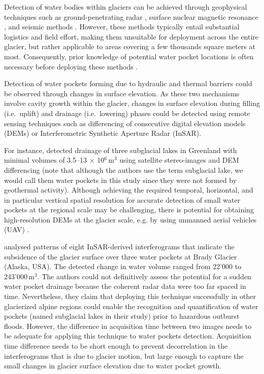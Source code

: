 Detection of water bodies within glaciers can be achieved through geophysical techniques such as ground-penetrating radar \citep[e.g.][]{Vincent&al2012,Church&al2021}, surface nuclear magnetic resonance \citep[e.g.][]{Legchenko&2014,Garambois&al2016}, and seismic methods \citep[e.g.][]{Horgan&al2012,Guillemot&al2024}. However, these methods typically entail substantial logistics and field effort, making them unsuitable for deployment across the entire glacier, but rather applicable to areas covering a few thousands square meters at most. Consequently, prior knowledge of potential water pocket locations is often necessary before deploying these methods \citep[e.g. the use of surface nucleid magnetic resonance following ground-penetrating radar analysis, as in][]{Vincent&al2012}. 

Detection of water pockets forming due to hydraulic and thermal barriers could be observed through changes in surface elevation. As these two mechanisms involve cavity growth within the glacier, changes in surface elevation during filling (i.e.\ uplift) and drainage (i.e.\ lowering) phases could be detected using remote sensing techniques such as differencing of consecutive digital elevation models (DEMs) or Interferometric Synthetic Aperture Radar (InSAR).

For instance, \cite{livingstone&al2019} detected drainage of three subglacial lakes in Greenland with minimal volumes of 3.5–13$\,\times$\,10$^6$\,m$^3$ using satellite stereo-images and DEM differencing (note that although the authors use the term subglacial lake, we would call them water pockets in this study since they were not formed by geothermal activity). Although achieving the required temporal, horizontal, and in particular vertical spatial resolution for accurate detection of small water pockets at the regional scale may be challenging, there is potential for obtaining high-resolution DEMs at the glacier scale, e.g. by using unmanned aerial vehicles (UAV) \citep[see][for UAV applications in glaciology]{Bhardwaj&al2016,Groos&al2022}.

\cite{Capps&al2010} analysed patterns of eight InSAR-derived interferograms that indicate the subsidence of the glacier surface over three water pockets at Brady Glacier (Alaska, USA). The detected change in water volume ranged from 22'000 to 243'000\,m$^3$. The authors could not definitively assess the potential for a sudden water pocket drainage because the coherent radar data were too far spaced in time. Nevertheless, they claim that deploying this technique successfully in other glacierized alpine regions could enable the recognition and quantification of water pockets (named subglacial lakes in their study) prior to hazardous outburst floods. However, the difference in acquisition time between two images needs to be adequate for applying this technique to water pockets detection. Acquisition time difference needs to be short enough to prevent decorrelation in the interferograms that is due to glacier motion, but large enough to capture the small changes in glacier surface elevation due to water pocket growth. 

